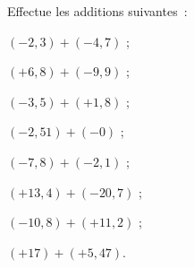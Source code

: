 \begin{exercice}
Effectue les additions suivantes :
\begin{colenumerate}{2}
 \item $(- 2,3) + (- 4,7)$ ;
 \item $(+ 6,8) + (- 9,9)$ ;
 \item $(- 3,5) + (+ 1,8)$ ;
 \item $(- 2,51) + (- 0)$ ;
 \item $(- 7,8) + (- 2,1)$ ;
 \item $(+ 13,4) + (- 20,7)$ ;
 \item $(- 10,8) + (+ 11,2)$ ;
 \item $(+ 17) + (+ 5,47)$.
 \end{colenumerate}
\end{exercice}


